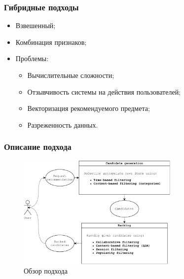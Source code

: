 \documentclass[xetex,mathserif,serif]{beamer}
\begin{document}
\begin{frame}
	\frametitle{Гибридные подходы}

	\begin{itemize}
		\item Взвешенный;
		\item Комбинация признаков;
		\item Проблемы:
		      \begin{itemize}
			      \item Вычислительные сложности;
                  \item Отзывчивость системы на действия пользователей;
			      \item Векторизация рекомендуемого предмета;
			      \item Разреженность данных.
		      \end{itemize}
	\end{itemize}
\end{frame}

\begin{frame}
	\frametitle{Описание подхода}

    \begin{figure}[h]
        \includegraphics[width=0.7\textwidth]{./images/architechture.pdf}
        \caption{Обзор подхода}
        \label{fig:arch}
        \centering
    \end{figure}

\end{frame}
\end{document}
